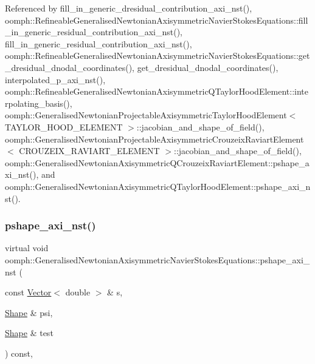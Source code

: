 Referenced by fill\+\_\+in\+\_\+generic\+\_\+dresidual\+\_\+contribution\+\_\+axi\+\_\+nst(), oomph\+::\+Refineable\+Generalised\+Newtonian\+Axisymmetric\+Navier\+Stokes\+Equations\+::fill\+\_\+in\+\_\+generic\+\_\+residual\+\_\+contribution\+\_\+axi\+\_\+nst(), fill\+\_\+in\+\_\+generic\+\_\+residual\+\_\+contribution\+\_\+axi\+\_\+nst(), oomph\+::\+Refineable\+Generalised\+Newtonian\+Axisymmetric\+Navier\+Stokes\+Equations\+::get\+\_\+dresidual\+\_\+dnodal\+\_\+coordinates(), get\+\_\+dresidual\+\_\+dnodal\+\_\+coordinates(), interpolated\+\_\+p\+\_\+axi\+\_\+nst(), oomph\+::\+Refineable\+Generalised\+Newtonian\+Axisymmetric\+Q\+Taylor\+Hood\+Element\+::interpolating\+\_\+basis(), oomph\+::\+Generalised\+Newtonian\+Projectable\+Axisymmetric\+Taylor\+Hood\+Element$<$ T\+A\+Y\+L\+O\+R\+\_\+\+H\+O\+O\+D\+\_\+\+E\+L\+E\+M\+E\+N\+T $>$\+::jacobian\+\_\+and\+\_\+shape\+\_\+of\+\_\+field(), oomph\+::\+Generalised\+Newtonian\+Projectable\+Axisymmetric\+Crouzeix\+Raviart\+Element$<$ C\+R\+O\+U\+Z\+E\+I\+X\+\_\+\+R\+A\+V\+I\+A\+R\+T\+\_\+\+E\+L\+E\+M\+E\+N\+T $>$\+::jacobian\+\_\+and\+\_\+shape\+\_\+of\+\_\+field(), oomph\+::\+Generalised\+Newtonian\+Axisymmetric\+Q\+Crouzeix\+Raviart\+Element\+::pshape\+\_\+axi\+\_\+nst(), and oomph\+::\+Generalised\+Newtonian\+Axisymmetric\+Q\+Taylor\+Hood\+Element\+::pshape\+\_\+axi\+\_\+nst().

\mbox{\label{classoomph_1_1GeneralisedNewtonianAxisymmetricNavierStokesEquations_a278087089b3cd5b354b57b997ce7a224}} 
\subsubsection{\texorpdfstring{pshape\+\_\+axi\+\_\+nst()}{pshape\_axi\_nst()}\hspace{0.1cm}{\footnotesize\ttfamily [2/2]}}
{\footnotesize\ttfamily virtual void oomph\+::\+Generalised\+Newtonian\+Axisymmetric\+Navier\+Stokes\+Equations\+::pshape\+\_\+axi\+\_\+nst (\begin{DoxyParamCaption}\item[{const \hyperlink{classoomph_1_1Vector}{Vector}$<$ double $>$ \&}]{s,  }\item[{\hyperlink{classoomph_1_1Shape}{Shape} \&}]{psi,  }\item[{\hyperlink{classoomph_1_1Shape}{Shape} \&}]{test }\end{DoxyParamCaption}) const\hspace{0.3cm}{\ttfamily [protected]}, {}}



